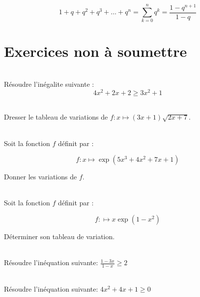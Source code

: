 \documentclass[12pt,fleqn]{report} %
\begin{document}
\begin{proposition}\text{ }\\
	\[
	1 + q + q^2 + q^3 + \dots + q^n = \sum_{k=0}^{n} q^k = \frac{1 - q^{n+1}}{1 - q}
	\]
\end{proposition}




\chapter*{Exercices non à soumettre}
\begin{exercise}\label{Exercice 3}\text{ }\\
	{Résoudre l'inégalite suivante :}
	\[
	4x^2 + 2x + 2 \ge 3x^2 +1 
	\]
\end{exercise}

\begin{exercise}\label{Exercice 6}\text{ }\\
	Dresser le tableau de variations de $f : x \mapsto (3x+1)\sqrt{2x+7}$.
\end{exercise}

\begin{exercise}\label{Exercice 26}\text{ }\\
	Soit la fonction $f$ définit par :
	
	\begin{equation*}
	f: x \mapsto \exp{\left(5x^3+4x^2+7x+1\right)}
	\end{equation*}
	
	Donner les variations de $f$.
\end{exercise}

\begin{exercise}\label{Exercice 28}\text{ }\\
	Soit la fonction $f$ définit par : 
	
	\begin{equation*}
	f: \mapsto x\exp\left(1-x^2\right)
	\end{equation*}
	
	Déterminer son tableau de variation.
\end{exercise}

\begin{exercise}\label{Exercice 34}\text{ }\\
	Résoudre l'inéquation suivante: $\frac{1-3x}{1-x}\geqslant 2$
\end{exercise}

\begin{exercise}\label{Exercice 35}\text{ }\\
	Résoudre l'inéquation suivante: $4x^2+4x+1\geqslant0$
\end{exercise}
\end{document}
